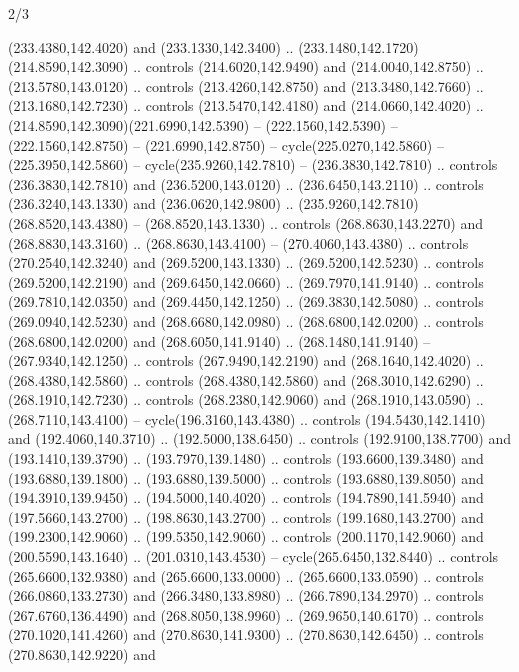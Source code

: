 \begin{flagdescription}{2/3}
\begin{scope}[xshift=0.5\flaglength,yshift=0.5\flagwidth,scale=\flagwidth/259.2]
\begin{scope}[y=0.8pt, x=0.8pt, yscale=-1,shift={(-243,-162)}]
      (233.4380,142.4020) and (233.1330,142.3400) ..
      (233.1480,142.1720)(214.8590,142.3090) .. controls (214.6020,142.9490) and
      (214.0040,142.8750) .. (213.5780,143.0120) .. controls (213.4260,142.8750) and
      (213.3480,142.7660) .. (213.1680,142.7230) .. controls (213.5470,142.4180) and
      (214.0660,142.4020) .. (214.8590,142.3090)(221.6990,142.5390) --
      (222.1560,142.5390) -- (222.1560,142.8750) -- (221.6990,142.8750) --
      cycle(225.0270,142.5860) -- (225.3950,142.5860) -- cycle(235.9260,142.7810) --
      (236.3830,142.7810) .. controls (236.3830,142.7810) and (236.5200,143.0120) ..
      (236.6450,143.2110) .. controls (236.3240,143.1330) and (236.0620,142.9800) ..
      (235.9260,142.7810)(268.8520,143.4380) -- (268.8520,143.1330) .. controls
      (268.8630,143.2270) and (268.8830,143.3160) .. (268.8630,143.4100) --
      (270.4060,143.4380) .. controls (270.2540,142.3240) and (269.5200,143.1330) ..
      (269.5200,142.5230) .. controls (269.5200,142.2190) and (269.6450,142.0660) ..
      (269.7970,141.9140) .. controls (269.7810,142.0350) and (269.4450,142.1250) ..
      (269.3830,142.5080) .. controls (269.0940,142.5230) and (268.6680,142.0980) ..
      (268.6800,142.0200) .. controls (268.6800,142.0200) and (268.6050,141.9140) ..
      (268.1480,141.9140) -- (267.9340,142.1250) .. controls (267.9490,142.2190) and
      (268.1640,142.4020) .. (268.4380,142.5860) .. controls (268.4380,142.5860) and
      (268.3010,142.6290) .. (268.1910,142.7230) .. controls (268.2380,142.9060) and
      (268.1910,143.0590) .. (268.7110,143.4100) -- cycle(196.3160,143.4380) ..
      controls (194.5430,142.1410) and (192.4060,140.3710) .. (192.5000,138.6450) ..
      controls (192.9100,138.7700) and (193.1410,139.3790) .. (193.7970,139.1480) ..
      controls (193.6600,139.3480) and (193.6880,139.1800) .. (193.6880,139.5000) ..
      controls (193.6880,139.8050) and (194.3910,139.9450) .. (194.5000,140.4020) ..
      controls (194.7890,141.5940) and (197.5660,143.2700) .. (198.8630,143.2700) ..
      controls (199.1680,143.2700) and (199.2300,142.9060) .. (199.5350,142.9060) ..
      controls (200.1170,142.9060) and (200.5590,143.1640) .. (201.0310,143.4530) --
      cycle(265.6450,132.8440) .. controls (265.6600,132.9380) and
      (265.6600,133.0000) .. (265.6600,133.0590) .. controls (266.0860,133.2730) and
      (266.3480,133.8980) .. (266.7890,134.2970) .. controls (267.6760,136.4490) and
      (268.8050,138.9960) .. (269.9650,140.6170) .. controls (270.1020,141.4260) and
      (270.8630,141.9300) .. (270.8630,142.6450) .. controls (270.8630,142.9220) and

\end{scope}
\end{scope}
\end{flagdescription}
